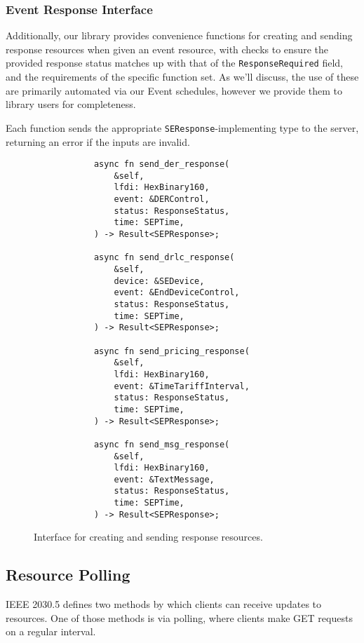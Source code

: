 \subsubsection{Event Response Interface}

Additionally, our library provides convenience functions for creating and sending response resources when given an event resource, with checks to ensure the provided response status matches up with that of the \texttt{ResponseRequired} field, and the requirements of the specific function set.  As we'll discuss, the use of these are primarily automated via our Event schedules, however we provide them to library users for completeness.

Each function sends the appropriate \texttt{SEResponse}-implementing type to the server, returning an error if the inputs are invalid.


\begin{figure}[h]
    \begin{center}
        \begin{lstlisting}
            async fn send_der_response(
                &self,
                lfdi: HexBinary160,
                event: &DERControl,
                status: ResponseStatus,
                time: SEPTime,
            ) -> Result<SEPResponse>;

            async fn send_drlc_response(
                &self,
                device: &SEDevice,
                event: &EndDeviceControl,
                status: ResponseStatus,
                time: SEPTime,
            ) -> Result<SEPResponse>;

            async fn send_pricing_response(
                &self,
                lfdi: HexBinary160,
                event: &TimeTariffInterval,
                status: ResponseStatus,
                time: SEPTime,
            ) -> Result<SEPResponse>;

            async fn send_msg_response(
                &self,
                lfdi: HexBinary160,
                event: &TextMessage,
                status: ResponseStatus,
                time: SEPTime,
            ) -> Result<SEPResponse>;
        \end{lstlisting}
        \label{fig:sendresponsefunc}
        \vspace{-10pt}
        \caption{Interface for creating and sending response resources.}
    \end{center}
\end{figure}

\subsection{Resource Polling}
IEEE 2030.5 defines two methods by which clients can receive updates to resources. One of those methods is via polling, where clients make GET requests on a regular interval.

